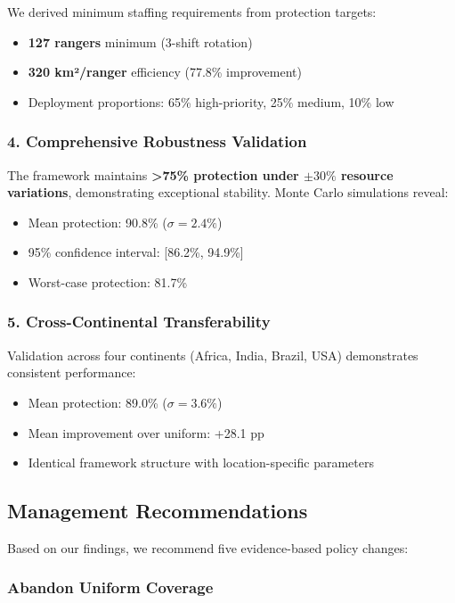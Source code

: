 We derived minimum staffing requirements from protection targets:
\begin{itemize}
    \item \textbf{127 rangers} minimum (3-shift rotation)
    \item \textbf{320 km²/ranger} efficiency (77.8\% improvement)
    \item Deployment proportions: 65\% high-priority, 25\% medium, 10\% low
\end{itemize}

\subsubsection{4. Comprehensive Robustness Validation}

The framework maintains \textbf{>75\% protection under $\pm30\%$ resource variations}, demonstrating exceptional stability. Monte Carlo simulations reveal:
\begin{itemize}
    \item Mean protection: 90.8\% ($\sigma = 2.4\%$)
    \item 95\% confidence interval: [86.2\%, 94.9\%]
    \item Worst-case protection: 81.7\%
\end{itemize}

\subsubsection{5. Cross-Continental Transferability}

Validation across four continents (Africa, India, Brazil, USA) demonstrates consistent performance:
\begin{itemize}
    \item Mean protection: 89.0\% ($\sigma = 3.6\%$)
    \item Mean improvement over uniform: +28.1 pp
    \item Identical framework structure with location-specific parameters
\end{itemize}

\subsection{Management Recommendations}

Based on our findings, we recommend five evidence-based policy changes:

\subsubsection{Abandon Uniform Coverage}

